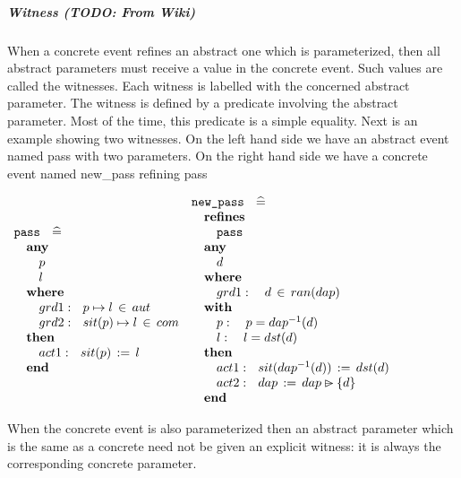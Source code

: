 \subparagraph{Witness (TODO: From Wiki)}

When a concrete event refines an abstract one which is parameterized, then all abstract parameters must receive a value in the concrete event. Such values are called the witnesses. Each witness is labelled with the concerned abstract parameter. The witness is defined by a predicate involving the abstract parameter. Most of the time, this predicate is a simple equality. Next is an example showing two witnesses. On the left hand side we have an abstract event named pass with two parameters. On the right hand side we have a concrete event named new\_pass refining pass 

$\begin{array}{l} \texttt{pass} \ \ \defi \\ \quad \textbf{any} \\ \quad \quad p \\ \quad \quad l \\ \quad \textbf{where}\\ \quad \quad grd1: \ \ {p \mapsto l \,\in\, aut}\\ \quad \quad grd2: \ \ sit(p)\mapsto l \,\in\, com \\ \quad \textbf{then} \\ \quad \quad act1: \ \ sit(p) \,:=\, l \\ \quad \textbf{end} \end{array}
\begin{array}{l} \texttt{new\_pass} \ \ \defi \\ \quad \textbf{refines} \\ \quad \quad \texttt{pass} \\ \quad \textbf{any} \\ \quad \quad d \\ \quad \textbf{where}\\ \quad \quad grd1: \ \ \ d \,\in\, ran(dap) \\ \quad \textbf{with} \\ \quad \quad p: \ \ \ p=dap^{-1}(d) \\ \quad \quad l: \ \ \ l=dst(d) \\ \quad \textbf{then} \\ \quad \quad act1: \ \ sit(dap^{-1}(d)) \,:=\, dst(d) \ \\ \quad \quad act2: \ \ dap \,:=\, dap \ransub \{d\} \\ \quad \textbf{end} \end{array} $

When the concrete event is also parameterized then an abstract parameter which is the same as a concrete need not be given an explicit witness: it is always the corresponding concrete parameter.

